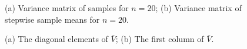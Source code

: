 \documentclass{article}
\begin{document}
\begin{figure}[!t]
  \centering
  \caption{(a) Variance matrix of samples for $n=20$; (b) Variance matrix of stepwise sample means for $n=20$.}
  \label{fig:var_20}
\end{figure}

\begin{figure}[!t]
  \centering
  \caption{(a) The diagonal elements of $\bar{V}$; (b) The first column of $\bar{V}$.}
  \label{fig:var_matrix_elements}
\end{figure}
\end{document}
